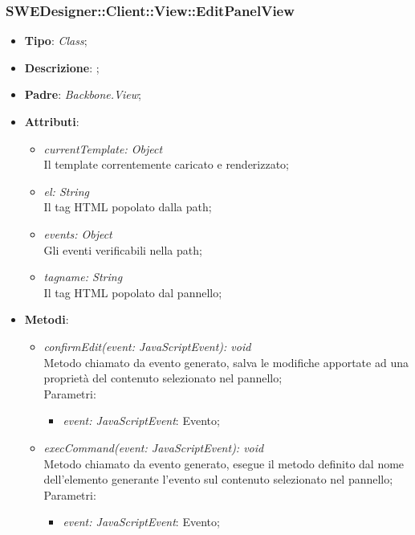 \documentclass[../DefinizioneDiProdotto.tex]{subfiles}
\begin{document}
				\subsubsection{SWEDesigner::Client::View::EditPanelView}
					\hypertarget{SWEDesigner::Client::View::EditPanelView}{}
					\begin{itemize}
						\item \textbf{Tipo}: \emph{Class};
						\item \textbf{Descrizione}: ;
						\item \textbf{Padre}: \emph{Backbone.View};
						\item \textbf{Attributi}:
						\begin{itemize}
							\item \emph{currentTemplate: Object}\\
							Il template correntemente caricato e renderizzato;
							\item \emph{el: String} \\
							Il tag HTML popolato dalla path;
							\item \emph{events: Object} \\
							Gli eventi verificabili nella path;
							\item \emph{tagname: String} \\
							Il tag HTML popolato dal pannello;
						\end{itemize}
						\item \textbf{Metodi}:
						\begin{itemize}
							\item \emph{confirmEdit(event: JavaScriptEvent): void} \\
							Metodo chiamato da evento generato, salva le modifiche apportate ad una proprietà del contenuto selezionato nel pannello; \\
							Parametri:
							\begin{itemize}
								\item \emph{event: JavaScriptEvent}: Evento;
							\end{itemize}
							\item \emph{execCommand(event: JavaScriptEvent): void} \\
							Metodo chiamato da evento generato, esegue il metodo definito dal nome dell'elemento generante l'evento sul contenuto selezionato nel pannello; \\
							Parametri:
							\begin{itemize}
								\item \emph{event: JavaScriptEvent}: Evento;

\end{itemize}
\end{itemize}
\end{itemize}
\end{document}
